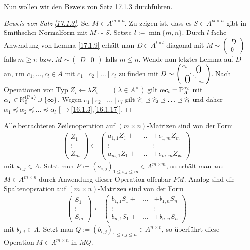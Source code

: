 \documentclass[../../main.tex]{subfiles}
\begin{document}
\begin{bewna}\label{17.1.11}
Nun wollen wir den Beweis von Satz 17.1.3 durchf\"uhren.
\begin{proof}[Beweis von Satz \ref{17.1.3}]
Sei $M\in A^{m\times n}$. Zu zeigen ist, dass es $S\in A^{m\times n}$ gibt in Smithscher Normalform mit $M\sim S$. Setzte $l:=\min\{m,n\}$. Durch $l$-fache Anwendung von Lemma \ref{17.1.9} erhält man $D\in A^{l\times l}$ diagonal mit $M\sim\begin{pmatrix}D\\0\end{pmatrix}$ falls $m\ge n$ bzw. $M\sim \begin{pmatrix}D&0\end{pmatrix}$ falls $m\le n$. Wende nun letztes Lemma auf $D$ an, um $c_1,\ldots ,c_l\in A$ mit $c_1\mid c_2\mid\ldots \mid c_l$ zu finden mit $D\sim \left(\begin{smallmatrix}
c_1 & & \llap{$\overset{\blap{\LARGE 0}}{~}$} \\
& \ddots &\\
\rlap{\tlap{\LARGE 0}} & & c_n
\end{smallmatrix}\right)$. Nach Operationen von Typ $Z_i\leftarrow \lambda Z_i\qquad (\lambda\in A^\times)$ gilt \oe $c_i=\P_A^{\alpha_i}$ mit $\alpha_I\in \expfam\cup\{\infty\}$. Wegen $c_1\mid c_2\mid\ldots \mid c_l$ gilt $\tc c_1\preceq \tc c_2\preceq\ldots \preceq \tc c_l$ und daher $\alpha_1\preceq \alpha_2\preceq\ldots \preceq \alpha_l$ [$\to$\ref{16.1.3},\ref{16.1.17}].
\end{proof}
\end{bewna}

\noindent Alle betrachteten Zeilenoperation auf $(m\times n)$-Matrizen sind von der Form
\begin{align*}
\begin{pmatrix}Z_1\\\vdots\\ Z_m\end{pmatrix}\leftarrow\begin{pmatrix}a_{1,1}Z_1+&\hdots&+a_{1,m}Z_m\\\vdots&&\vdots\\ a_{m,1}Z_1+&\hdots&+a_{m,m}Z_m\end{pmatrix}
\end{align*}
mit $a_{i,j}\in A$. Setzt man $P:=(a_{i,j})_{1\le i,j\le m}\in A^{m\times m}$, so erhält man aus $M\in A^{m\times n}$ durch Anwendung dieser Operation offenbar $PM$. Analog sind die Spaltenoperation auf $(m\times n)$-Matrizen sind von der Form
\begin{align*}
\begin{pmatrix}S_1\\\vdots\\ S_m\end{pmatrix}\leftarrow\begin{pmatrix}b_{1,1}S_1+&\hdots&+b_{1,n}S_n\\\vdots&&\vdots\\ b_{n,1}S_1+&\hdots&+b_{n,n}S_n\end{pmatrix}
\end{align*}
mit $b_{j,i}\in A$. Setzt man $Q:=(b_{i,j})_{1\le i,j\le n}\in A^{n\times n}$, so überführt diese Operation $M\in A^{m\times n}$ in $MQ$.
\end{document}
